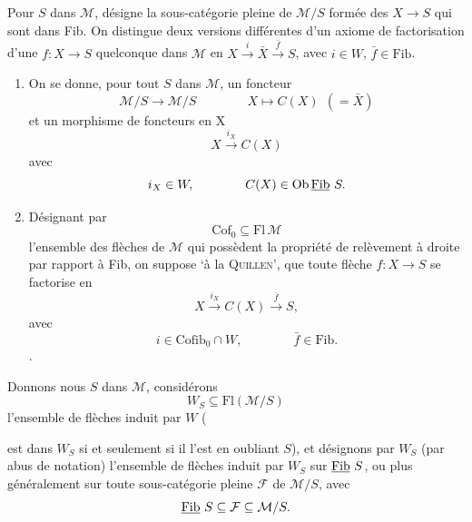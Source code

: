 Pour $S$ dans $\mathcal{M}$,  désigne la sous-catégorie pleine de $\mathcal{M}/S$ formée des $X\longrightarrow S$ qui sont dans Fib. On distingue deux versions différentes d'un axiome de factorisation d'une $f : X\longrightarrow S$ quelconque dans $\mathcal{M}$ en $X\xrightarrow{i}\bar X\xrightarrow{\bar f}S$, avec $i\in W$, $\bar f\in\mathrm{Fib}$.



\begin{enumerate}[label={}]
\item[A)] On se donne, pour tout $S$ dans $\mathcal{M}$, un foncteur
\[
\mathcal{M}/S\longrightarrow\mathcal{M}/S\qquad\qquad X\longmapsto C(X)\ \ (=\bar X)
\]
et un morphisme de foncteurs en $\mathrm{X}$
\[
X\xrightarrow{i_X}C(X)
\]
avec
\[
i_X\in W,\qquad\qquad C(X)\in\mathrm{Ob}\,\underline{\mathrm{Fib}}\,\,S.
\]
\item[B)] Désignant par
\[
\mathrm{Cof}_0\subseteq\mathrm{Fl}\,\mathcal{M}
\]
l'ensemble des flèches de $\mathcal{M}$ qui possèdent la propriété de relèvement à droite par rapport à Fib, on suppose ‘à la \textsc{Quillen}’, que toute flèche $f : X\longrightarrow S$ se factorise en
\[
X\xrightarrow{i_X}C(X)\xrightarrow{\bar f}S,
\]
avec
\[
i\in\mathrm{Cofib}_0\cap W,\qquad\qquad\bar f\in\mathrm{Fib}.
\]
.
\end{enumerate}

Donnons nous $S$ dans $\mathcal{M}$, considérons
\[
W_S\subseteq\mathrm{Fl}(\mathcal{M}/S)
\]
l'ensemble de flèches induit par $W$ (
est dans $W_S$ si et seulement si il l'est en oubliant $S$), et désignons par $W_S$ (par abus de notation) l'ensemble de flèches induit par $W_S$ sur $\underline{\mathrm{Fib}}\,\,S$, ou plus généralement sur toute sous-catégorie pleine $\mathcal{F}$ de $\mathcal{M}/S$, avec
\[
\underline{\mathrm{Fib}}\,\,S\subseteq\mathcal{F}\subseteq\mathcal{M}/S.
\]


